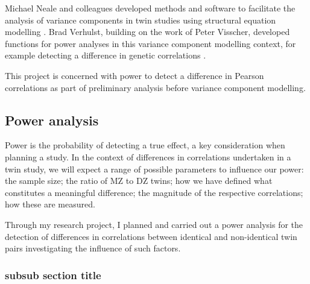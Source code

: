 Michael Neale and colleagues developed methods and software to facilitate the analysis of variance components in twin studies using structural equation modelling \cite{Neale1992}.  Brad Verhulst, building on the work of Peter Visscher, developed functions for power analyses in this variance component modelling context, for example detecting a difference in genetic correlations \cite{Visscher2004,Visscher2008a}.

This project is concerned with power to detect a difference in Pearson correlations as part of preliminary analysis before variance component modelling.

\subsection{Power analysis}

Power is the probability of detecting a true effect, a key consideration when planning a study.  In the context of differences in correlations undertaken in a twin study, we will expect a range of possible parameters to influence our power: the sample size; the ratio of MZ to DZ twins; how we have defined what constitutes a meaningful difference; the magnitude of the respective correlations; how these are measured.

Through my research project, I planned and carried out a power analysis for the detection of differences in correlations between identical and non-identical twin pairs investigating the influence of such factors.  

 \subsubsection{subsub section title}
 

			
